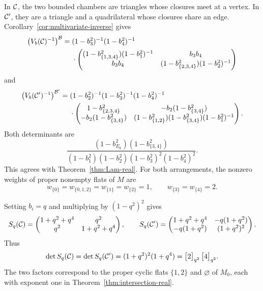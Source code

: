 \begin{example}
In $\mathcal C$, the two bounded chambers are triangles whose closures meet
at a vertex. In $\mathcal C'$, they are a triangle and a quadrilateral whose
closures share an edge. Corollary~\ref{cor:multivariate-inverse} gives
\[
 \begin{aligned}
 \bigl(V_b(\mathcal C)^{-1}\bigr)^{\mathcal B}
 ={}&(1-b_3^2)^{-1}(1-b_4^2)^{-1}\\
 &{}\cdot
 \begin{pmatrix}
  (1-b_{\{1,3,4\}}^2)(1-b_1^2)^{-1}&b_3b_4\\
  b_3b_4&(1-b_{\{2,3,4\}}^2)(1-b_2^2)^{-1}
 \end{pmatrix}
 \end{aligned}
\]
and
\[
 \begin{aligned}
 \bigl(V_b(\mathcal C')^{-1}\bigr)^{\mathcal B'}
 ={}&(1-b_2^2)^{-1}(1-b_3^2)^{-1}(1-b_4^2)^{-1}\\
 &{}\cdot
 \begin{pmatrix}
  1-b_{\{2,3,4\}}^2&-b_2(1-b_{\{3,4\}}^2)\\
  -b_2(1-b_{\{3,4\}}^2)&
  (1-b_{\{1,2\}}^2)(1-b_{\{3,4\}}^2)(1-b_1^2)^{-1}
 \end{pmatrix}.
 \end{aligned}
\]
Both determinants are
\[
 \frac{(1-b_{E_0}^2)(1-b_{\{3,4\}}^2)}
 {(1-b_1^2)(1-b_2^2)(1-b_3^2)^2(1-b_4^2)^2}.
\]
This agrees with Theorem~\ref{thm:Lam-real}. For both arrangements,
the nonzero weights of proper nonempty flats of $M$ are
\[
 w_{\{0\}}=w_{\{0,1,2\}}=w_{\{1\}}=w_{\{2\}}=1,
 \qquad w_{\{3\}}=w_{\{4\}}=2.
\]

Setting $b_i=q$ and multiplying by $(1-q^2)^2$ gives
\[
 S_q(\mathcal C)=
 \begin{pmatrix}
  1+q^2+q^4&q^2\\
  q^2&1+q^2+q^4
 \end{pmatrix},\qquad
 S_q(\mathcal C')=
 \begin{pmatrix}
  1+q^2+q^4&-q(1+q^2)\\
  -q(1+q^2)&(1+q^2)^2
 \end{pmatrix}.
\]
Thus
\[
 \det S_q(\mathcal C)=\det S_q(\mathcal C')
 =(1+q^2)^2(1+q^4)=\bigl[2\bigr]_{q^2}\,\bigl[4\bigr]_{q^2}.
\]
The two factors correspond to the proper cyclic flats
$\{1,2\}$ and $\varnothing$ of $M_0$, each with exponent one in
Theorem~\ref{thm:intersection-real}.
\end{example}
